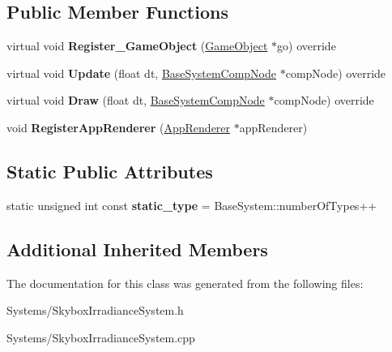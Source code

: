 \subsection*{Public Member Functions}
\begin{DoxyCompactItemize}
\item 
\mbox{\label{classSkyboxIrradianceSystem_af9fbbcba5c7f8f4dce12d973d309f628}} 
virtual void {\bfseries Register\+\_\+\+Game\+Object} (\hyperlink{classGameObject}{Game\+Object} $\ast$go) override
\item 
\mbox{\label{classSkyboxIrradianceSystem_ad1acf756b9540bb2864e5bf9631f9539}} 
virtual void {\bfseries Update} (float dt, \hyperlink{structBaseSystemCompNode}{Base\+System\+Comp\+Node} $\ast$comp\+Node) override
\item 
\mbox{\label{classSkyboxIrradianceSystem_ad92a2f34b70b8b7a4e367b5014e21909}} 
virtual void {\bfseries Draw} (float dt, \hyperlink{structBaseSystemCompNode}{Base\+System\+Comp\+Node} $\ast$comp\+Node) override
\item 
\mbox{\label{classSkyboxIrradianceSystem_abff712498958bb3078702225500035b5}} 
void {\bfseries Register\+App\+Renderer} (\hyperlink{classAppRenderer}{App\+Renderer} $\ast$app\+Renderer)
\end{DoxyCompactItemize}
\subsection*{Static Public Attributes}
\begin{DoxyCompactItemize}
\item 
\mbox{\label{classSkyboxIrradianceSystem_a6d0911dc3dcb2e2234c740cc4d3afc70}} 
static unsigned int const {\bfseries static\+\_\+type} = Base\+System\+::number\+Of\+Types++
\end{DoxyCompactItemize}
\subsection*{Additional Inherited Members}


The documentation for this class was generated from the following files\+:\begin{DoxyCompactItemize}
\item 
Systems/Skybox\+Irradiance\+System.\+h\item 
Systems/Skybox\+Irradiance\+System.\+cpp\end{DoxyCompactItemize}
